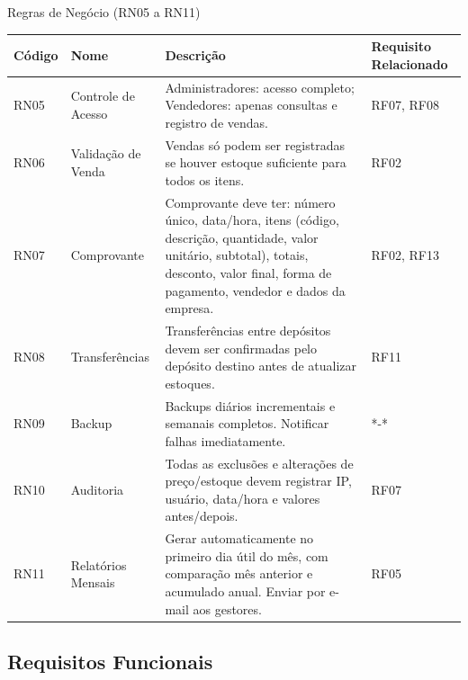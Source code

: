 \documentclass[
	12pt,				%
	openany,			%
	twoside,			%
	a4paper,			%
	english,			%
	brazil				%
	]{abntex2}
\begin{document}
\FloatBarrier


\begin{quadro}[htb]
\caption{\label{quadro_rn2}Regras de Negócio (RN05 a RN11)}
\hspace*{-1cm}
\begin{tabular}{|p{1.6cm}|p{4.0cm}|p{7.5cm}|p{2.0cm}|}
    \hline
    \textbf{Código} & \textbf{Nome} & \textbf{Descrição} & \textbf{Requisito Relacionado} \\ \hline

 

   RN05 & Controle de Acesso & Administradores: acesso completo; Vendedores: apenas consultas e registro de vendas. & RF07, RF08 \\ \hline

RN06 & Validação de Venda & Vendas só podem ser registradas se houver estoque suficiente para todos os itens. & RF02 \\ \hline

RN07 & Comprovante & Comprovante deve ter: número único, data/hora, itens (código, descrição, quantidade, valor unitário, subtotal), totais, desconto, valor final, forma de pagamento, vendedor e dados da empresa. & RF02, RF13 \\ \hline

RN08 & Transferências & Transferências entre depósitos devem ser confirmadas pelo depósito destino antes de atualizar estoques. & RF11 \\ \hline

RN09 & Backup & Backups diários incrementais e semanais completos. Notificar falhas imediatamente. & *-* \\ \hline

RN10 & Auditoria & Todas as exclusões e alterações de preço/estoque devem registrar IP, usuário, data/hora e valores antes/depois. & RF07 \\ \hline

RN11 & Relatórios Mensais & Gerar automaticamente no primeiro dia útil do mês, com comparação mês anterior e acumulado anual. Enviar por e-mail aos gestores. & RF05 \\ \hline

\end{tabular}
\end{quadro}

\FloatBarrier




\subsection{Requisitos Funcionais}
\end{document}
